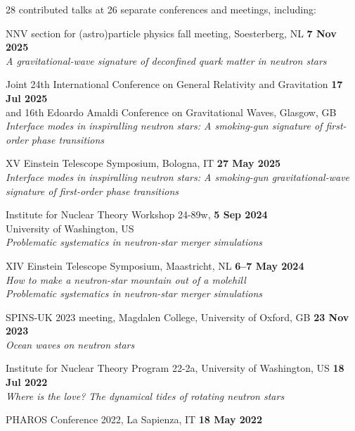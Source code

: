 28 contributed talks at 26 separate conferences and meetings, including:
%
\vspace*{0.05in}
\begin{etaremune}
    \item NNV section for (astro)particle physics fall meeting, Soesterberg, NL
    \hfill \textbf{7 Nov 2025} \\
    \textit{A gravitational-wave signature of deconfined quark matter in neutron stars}
    \item Joint 24th International Conference on General Relativity and Gravitation
    \hfill \textbf{17 Jul 2025} \\
    and 16th Edoardo Amaldi Conference on Gravitational Waves, Glasgow, GB \\
    \textit{Interface modes in inspiralling neutron stars: A smoking-gun signature of first-order phase transitions}
    \item XV Einstein Telescope Symposium, Bologna, IT
    \hfill \textbf{27 May 2025} \\
    \textit{Interface modes in inspiralling neutron stars: A smoking-gun gravitational-wave signature of first-order phase transitions}
    \item Institute for Nuclear Theory Workshop 24-89w,
    \hfill \textbf{5 Sep 2024} \\
    University of Washington, US \\
    \textit{Problematic systematics in neutron-star merger simulations}
    \item XIV Einstein Telescope Symposium, Maastricht, NL
    \hfill \textbf{6--7 May 2024} \\
    \textit{How to make a neutron-star mountain out of a molehill \\
    \textit{Problematic systematics in neutron-star merger simulations}}
    \item SPINS-UK 2023 meeting, Magdalen College, University of Oxford, GB
    \hfill \textbf{23 Nov 2023} \\
    \textit{Ocean waves on neutron stars}
    \item Institute for Nuclear Theory Program 22-2a, University of Washington, US
    \hfill \textbf{18 Jul 2022} \\
    \textit{Where is the love? The dynamical tides of rotating neutron stars}
    \item PHAROS Conference 2022, La Sapienza, IT
    \hfill \textbf{18 May 2022} \\

\end{etaremune}
